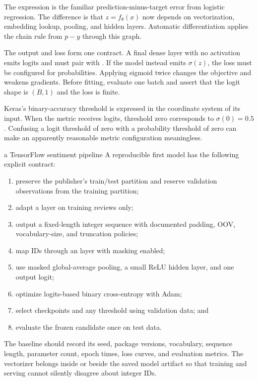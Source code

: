 The expression is the familiar prediction-minus-target error from logistic
regression. The difference is that $z=f_\theta(x)$ now depends on vectorization,
embedding lookup, pooling, and hidden layers. Automatic differentiation applies
the chain rule from $p-y$ through this graph.

The output and loss form one contract. A final dense layer with no activation
emits logits and must pair with
. If the model instead emits
$\sigma(z)$, the loss must be configured for probabilities. Applying sigmoid
twice changes the objective and weakens gradients. Before fitting, evaluate one
batch and assert that the logit shape is $(B,1)$ and the loss is finite.

Keras's binary-accuracy threshold is expressed in the coordinate system of its
input. When the metric receives logits, threshold zero corresponds to
$\sigma(0)=0.5$. Confusing a logit threshold of zero with a probability
threshold of zero can make an apparently reasonable metric configuration
meaningless.

\begin{workedexample}{a TensorFlow sentiment pipeline}
A reproducible first model has the following explicit contract:
\begin{enumerate}
  \item preserve the publisher's train/test partition and reserve validation
  observations from the training partition;
  \item adapt a  layer on training reviews only;
  \item output a fixed-length integer sequence with documented padding, OOV,
  vocabulary-size, and truncation policies;
  \item map IDs through an  layer with masking enabled;
  \item use masked global-average pooling, a small ReLU hidden layer, and one
  output logit;
  \item optimize logits-based binary cross-entropy with Adam;
  \item select checkpoints and any threshold using validation data; and
  \item evaluate the frozen candidate once on test data.
\end{enumerate}

The baseline should record its seed, package versions, vocabulary, sequence
length, parameter count, epoch times, loss curves, and evaluation metrics.
The vectorizer belongs inside or beside the saved model artifact so that
training and serving cannot silently disagree about integer IDs.
\end{workedexample}

